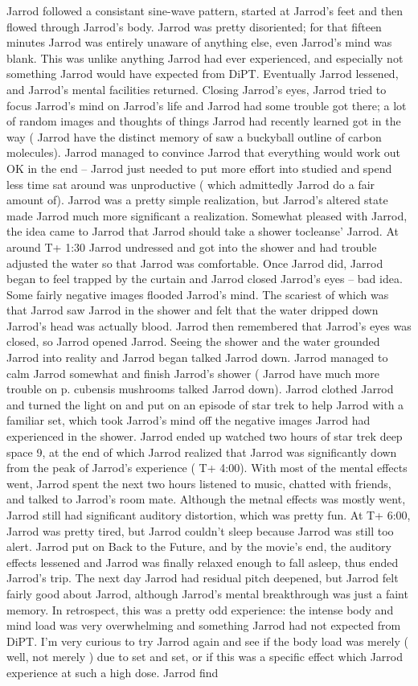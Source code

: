 \documentclass[12pt]{book}
\begin{document}
Jarrod followed a consistant sine-wave pattern, started at Jarrod's feet and then flowed through Jarrod's body. Jarrod was pretty disoriented; for that fifteen minutes Jarrod was entirely unaware of anything else, even Jarrod's mind was blank. This was unlike anything Jarrod had ever experienced, and especially not something Jarrod would have expected from DiPT. Eventually Jarrod lessened, and Jarrod's mental facilities returned. Closing Jarrod's eyes, Jarrod tried to focus Jarrod's mind on Jarrod's life and Jarrod had some trouble got there; a lot of random images and thoughts of things Jarrod had recently learned got in the way ( Jarrod have the distinct memory of saw a buckyball outline of carbon molecules). Jarrod managed to convince Jarrod that everything would work out OK in the end -- Jarrod just needed to put more effort into studied and spend less time sat around was unproductive ( which admittedly Jarrod do a fair amount of). Jarrod was a pretty simple realization, but Jarrod's altered state made Jarrod much more significant a realization. Somewhat pleased with Jarrod, the idea came to Jarrod that Jarrod should take a shower tocleanse' Jarrod. At around T+ 1:30 Jarrod undressed and got into the shower and had trouble adjusted the water so that Jarrod was comfortable. Once Jarrod did, Jarrod began to feel trapped by the curtain and Jarrod closed Jarrod's eyes -- bad idea. Some fairly negative images flooded Jarrod's mind. The scariest of which was that Jarrod saw Jarrod in the shower and felt that the water dripped down Jarrod's head was actually blood. Jarrod then remembered that Jarrod's eyes was closed, so Jarrod opened Jarrod. Seeing the shower and the water grounded Jarrod into reality and Jarrod began talked Jarrod down. Jarrod managed to calm Jarrod somewhat and finish Jarrod's shower ( Jarrod have much more trouble on p. cubensis mushrooms talked Jarrod down). Jarrod clothed Jarrod and turned the light on and put on an episode of star trek to help Jarrod with a familiar set, which took Jarrod's mind off the negative images Jarrod had experienced in the shower. Jarrod ended up watched two hours of star trek deep space 9, at the end of which Jarrod realized that Jarrod was significantly down from the peak of Jarrod's experience ( T+ 4:00). With most of the mental effects went, Jarrod spent the next two hours listened to music, chatted with friends, and talked to Jarrod's room mate. Although the metnal effects was mostly went, Jarrod still had significant auditory distortion, which was pretty fun. At T+ 6:00, Jarrod was pretty tired, but Jarrod couldn't sleep because Jarrod was still too alert. Jarrod put on Back to the Future, and by the movie's end, the auditory effects lessened and Jarrod was finally relaxed enough to fall asleep, thus ended Jarrod's trip. The next day Jarrod had residual pitch deepened, but Jarrod felt fairly good about Jarrod, although Jarrod's mental breakthrough was just a faint memory. In retrospect, this was a pretty odd experience: the intense body and mind load was very overwhelming and something Jarrod had not expected from DiPT. I'm very curious to try Jarrod again and see if the body load was merely ( well, not merely ) due to set and set, or if this was a specific effect which Jarrod experience at such a high dose. Jarrod find 
\end{document}
